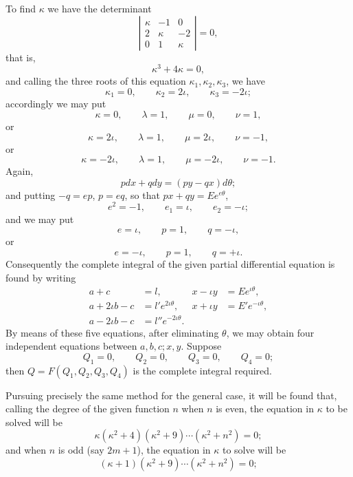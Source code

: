 \documentclass[11pt]{article}
\newcommand{\sourcepage}[1]{\marginpar{\scriptsize p.~#1}}
\begin{document}
{{\sourcepage{359}
To find $\kappa$ we have the determinant
\[
\left|\begin{array}{ccc}
\kappa&-1&0\\
2&\kappa&-2\\
0&1&\kappa
\end{array}\right|=0,
\]
that is,
\[
\kappa^3+4\kappa=0,
\]
and calling the three roots of this equation $\kappa_1,\kappa_2,\kappa_3$, we have
\[
\kappa_1=0,
\qquad \kappa_2=2\iota,
\qquad \kappa_3=-2\iota;
\]
accordingly we may put
\[
\kappa=0,
\qquad \lambda=1,
\qquad \mu=0,
\qquad \nu=1,
\]
or
\[
\kappa=2\iota,
\qquad \lambda=1,
\qquad \mu=2\iota,
\qquad \nu=-1,
\]
or
\[
\kappa=-2\iota,
\qquad \lambda=1,
\qquad \mu=-2\iota,
\qquad \nu=-1.
\]
Again,
\[
pdx+qdy=(py-qx)d\theta;
\]
and putting $-q=ep$, $p=eq$, so that $px+qy=Ee^{e\theta}$,
\[
e^2=-1,
\qquad e_1=\iota,
\qquad e_2=-\iota;
\]
and we may put
\[
e=\iota,
\qquad p=1,
\qquad q=-\iota,
\]
or
\[
e=-\iota,
\qquad p=1,
\qquad q=+\iota.
\]
Consequently the complete integral of the given partial differential equation is found by writing
\[
\begin{array}{rlrl}
a+c&=l,& x-\iota y&=Ee^{\iota\theta},\\
a+2\iota b-c&=l'e^{2\iota\theta},& x+\iota y&=E'e^{-\iota\theta},\\
a-2\iota b-c&=l''e^{-2\iota\theta}.&
\end{array}
\]
By means of these five equations, after eliminating $\theta$, we may obtain four independent equations between $a,b,c;x,y$. Suppose
\[
Q_1=0,
\qquad Q_2=0,
\qquad Q_3=0,
\qquad Q_4=0;
\]
then $Q=F(Q_1,Q_2,Q_3,Q_4)$ is the complete integral required.

Pursuing precisely the same method for the general case, it will be found that, calling the degree of the given function $n$ when $n$ is even, the equation in $\kappa$ to be solved will be
\[
\kappa(\kappa^2+4)(\kappa^2+9)\cdots(\kappa^2+n^2)=0;
\]
and when $n$ is odd (say $2m+1$), the equation in $\kappa$ to solve will be
\[
(\kappa+1)(\kappa^2+9)\cdots(\kappa^2+n^2)=0;
\]

}}
\end{document}
